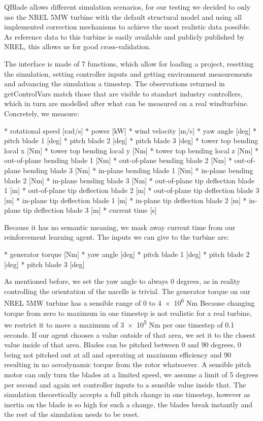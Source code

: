 \documentclass[hyperref,german,beleg]{cgvpub}
\begin{document}
QBlade allows different simulation scenarios, for our testing we decided to only use the NREL 5MW \cite{Jonkman_Butterfield_Musial_Scott_2009} turbine with the default structural model and using all implemented correction mechanisms to achieve the most realistic data possible. As reference data to this turbine is easily available and publicly published by NREL, this allows us for good cross-validation.

The interface is made of 7 functions, which allow for loading a project, resetting the simulation, setting controller inputs and getting environment measurements and advancing the simulation a timestep. The observations returned in getControlVars match those that are visible to standart industry controllers, which in turn are modelled after what can be measured on a real windturbine. Concretely, we measure:
\begin{code}
* rotational speed [rad/s]
* power [kW]
* wind velocity [m/s]
* yaw angle [deg]
* pitch blade 1 [deg]
* pitch blade 2 [deg]
* pitch blade 3 [deg]
* tower top bending local x [Nm]
* tower top bending local y [Nm]
* tower top bending local z [Nm]
* out-of-plane bending blade 1 [Nm]
* out-of-plane bending blade 2 [Nm]
* out-of-plane bending blade 3 [Nm]
* in-plane bending blade 1 [Nm]
* in-plane bending blade 2 [Nm]
* in-plane bending blade 3 [Nm]
* out-of-plane tip deflection blade 1 [m]
* out-of-plane tip deflection blade 2 [m]
* out-of-plane tip deflection blade 3 [m]
* in-plane tip deflection blade 1 [m]
* in-plane tip deflection blade 2 [m]
* in-plane tip deflection blade 3 [m]
* current time [s]
\end{code}

Because it has no semantic meaning, we mask away current time from our reinforcement learning agent. The inputs we can give to the turbine are:
\begin{code}
* generator torque [Nm]
* yaw angle [deg]
* pitch blade 1 [deg]
* pitch blade 2 [deg]
* pitch blade 3 [deg]
\end{code}

As mentioned before, we set the yaw angle to always 0 degrees, as in reality controlling the orientation of the nacelle is trivial. The generator torque on our NREL 5MW turbine has a sensible range of \num{0} to \num{4e6} Nm%
Because changing torque from zero to maximum in one timestep is not realistic for a real turbine, we restrict it to move a maximum of \num{3e5} Nm per one timestep of 0.1 seconds. If our agent chooses a value outside of that area, we set it to the closest value inside of that area.
Blades can be pitched between 0 and 90 degrees, 0 being not pitched out at all and operating at maximum efficiency and 90 resulting in no aerodynamic torque from the rotor whatsoever. A sensible pitch motor can only turn the blades at a limited speed, we assume a limit of 5 degrees per second and again set controller inputs to a sensible value inside that. The simulation theoretically accepts a full pitch change in one timestep, however as inertia on the blade is so high for such a change, the blades break instantly and the rest of the simulation needs to be reset.
\end{document}
